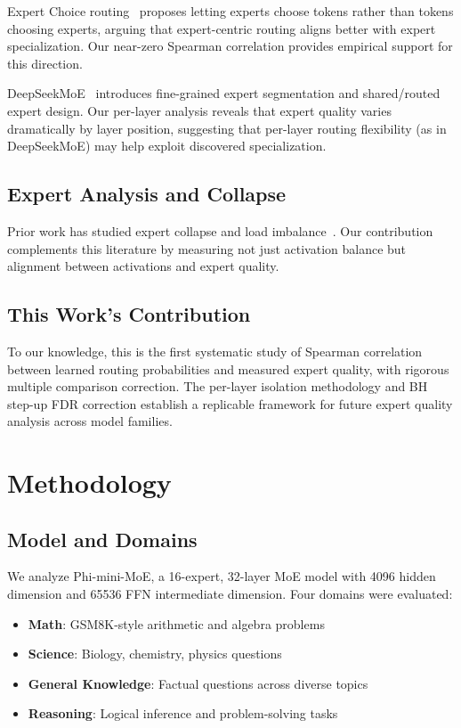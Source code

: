 \documentclass[11pt,a4paper]{article}
\begin{document}
Expert Choice routing~\citep{Zhou2022ExpertChoice} proposes letting experts choose tokens rather than tokens choosing experts, arguing that expert-centric routing aligns better with expert specialization. Our near-zero Spearman correlation provides empirical support for this direction.

DeepSeekMoE~\citep{Dai2024DeepSeekMoE} introduces fine-grained expert segmentation and shared/routed expert design. Our per-layer analysis reveals that expert quality varies dramatically by layer position, suggesting that per-layer routing flexibility (as in DeepSeekMoE) may help exploit discovered specialization.

\subsection{Expert Analysis and Collapse}

Prior work has studied expert collapse and load imbalance~\citep{Lepikhin2020GShard, Shazeer2017Outrageously}. Our contribution complements this literature by measuring not just activation balance but alignment between activations and expert quality.

\subsection{This Work's Contribution}

To our knowledge, this is the first systematic study of Spearman correlation between learned routing probabilities and measured expert quality, with rigorous multiple comparison correction. The per-layer isolation methodology and BH step-up FDR correction establish a replicable framework for future expert quality analysis across model families.

\section{Methodology}

\subsection{Model and Domains}

We analyze Phi-mini-MoE, a 16-expert, 32-layer MoE model with 4096 hidden dimension and 65536 FFN intermediate dimension. Four domains were evaluated:
\begin{itemize}
\item \textbf{Math}: GSM8K-style arithmetic and algebra problems
\item \textbf{Science}: Biology, chemistry, physics questions
\item \textbf{General Knowledge}: Factual questions across diverse topics
\item \textbf{Reasoning}: Logical inference and problem-solving tasks
\end{itemize}
\end{document}
